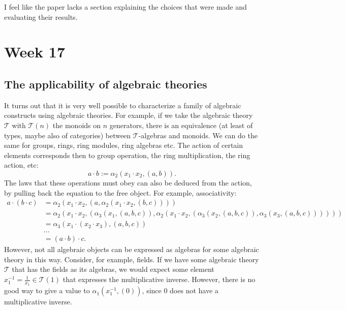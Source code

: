 \documentclass{amsbook}
\theoremstyle{definition}
\begin{document}
  I feel like the paper lacks a section explaining the choices that were made and evaluating their results.

  \chapter*{Week 17}
  \section{The applicability of algebraic theories}
  It turns out that it is very well possible to characterize a family of algebraic constructs using algebraic theories. For example, if we take the algebraic theory $ \mathcal T $ with $ \mathcal T(n) $ the monoids on $ n $ generators, there is an equivalence (at least of types, maybe also of categories) between $ \mathcal T $-algebras and monoids. We can do the same for groups, rings, ring modules, ring algebras etc. The action of certain elements corresponds then to group operation, the ring multiplication, the ring action, etc:
  \[ a \cdot b := \alpha_2(x_1 \cdot x_2, (a, b)). \]
  The laws that these operations must obey can also be deduced from the action, by pulling back the equation to the free object. For example, associativity:
  \begin{align*}
    a \cdot (b \cdot c) &= \alpha_2(x_1 \cdot x_2, (a, \alpha_2(x_1 \cdot x_2, (b, c))))\\
    &= \alpha_2(x_1 \cdot x_2, (\alpha_3(x_1, (a, b, c)), \alpha_2(x_1 \cdot x_2, (\alpha_3(x_2, (a, b, c)), \alpha_3(x_3, (a, b, c))))))\\
    &= \alpha_3(x_1 \cdot (x_2 \cdot x_3), (a, b, c))\\
    &\dots\\
    &= (a \cdot b) \cdot c.
  \end{align*}
  However, not all algebraic objects can be expressed as algebras for some algebraic theory in this way. Consider, for example, fields. If we have some algebraic theory $ \mathcal T $ that has the fields as its algebras, we would expect some element $ x_1^{-1} = \frac{1}{x_1} \in \mathcal T(1) $ that expresses the multiplicative inverse. However, there is no good way to give a value to $ \alpha_1(x_1^{-1}, (0)) $, since $ 0 $ does not have a multiplicative inverse.
\end{document}
